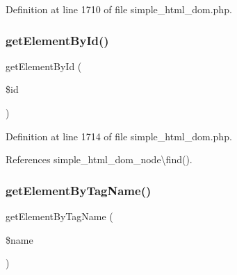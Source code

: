Definition at line 1710 of file simple\+\_\+html\+\_\+dom.\+php.


\hypertarget{classsimple__html__dom_aec6ca41b9859728595ece521ca638e48}{}\label{classsimple__html__dom_aec6ca41b9859728595ece521ca638e48} 
\subsubsection{\texorpdfstring{get\+Element\+By\+Id()}{getElementById()}}
{\footnotesize\ttfamily get\+Element\+By\+Id (\begin{DoxyParamCaption}\item[{}]{\$id }\end{DoxyParamCaption})}



Definition at line 1714 of file simple\+\_\+html\+\_\+dom.\+php.



References simple\+\_\+html\+\_\+dom\+\_\+node\textbackslash{}find().


\hypertarget{classsimple__html__dom_a73eb6caf89c86044a5ed0092484f375d}{}\label{classsimple__html__dom_a73eb6caf89c86044a5ed0092484f375d} 
\subsubsection{\texorpdfstring{get\+Element\+By\+Tag\+Name()}{getElementByTagName()}}
{\footnotesize\ttfamily get\+Element\+By\+Tag\+Name (\begin{DoxyParamCaption}\item[{}]{\$name }\end{DoxyParamCaption})}



